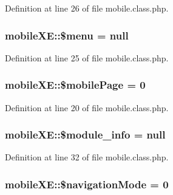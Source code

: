 Definition at line 26 of file mobile.\-class.\-php.

\hypertarget{classmobileXE_a0ebb4296d28c9cb49fabb4d1252c1434}{
\subsubsection[{\$menu}]{\setlength{\rightskip}{0pt plus 5cm}mobile\-X\-E\-::\$menu = null}}\label{classmobileXE_a0ebb4296d28c9cb49fabb4d1252c1434}


Definition at line 25 of file mobile.\-class.\-php.

\hypertarget{classmobileXE_a4017307825d19d450c677b25b70eab5e}{
\subsubsection[{\$mobile\-Page}]{\setlength{\rightskip}{0pt plus 5cm}mobile\-X\-E\-::\$mobile\-Page = 0}}\label{classmobileXE_a4017307825d19d450c677b25b70eab5e}


Definition at line 20 of file mobile.\-class.\-php.

\hypertarget{classmobileXE_a926916a0195e056ccfdaf284e56b0ea6}{
\subsubsection[{\$module\-\_\-info}]{\setlength{\rightskip}{0pt plus 5cm}mobile\-X\-E\-::\$module\-\_\-info = null}}\label{classmobileXE_a926916a0195e056ccfdaf284e56b0ea6}


Definition at line 32 of file mobile.\-class.\-php.

\hypertarget{classmobileXE_aa6e85b2d6fe4667d7d0a3a2b3f13bd12}{
\subsubsection[{\$navigation\-Mode}]{\setlength{\rightskip}{0pt plus 5cm}mobile\-X\-E\-::\$navigation\-Mode = 0}}\label{classmobileXE_aa6e85b2d6fe4667d7d0a3a2b3f13bd12}


